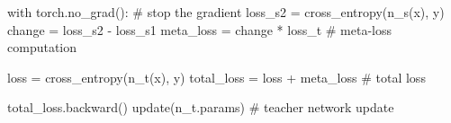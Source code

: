 \begin{algorithm}[!htbp]
\begin{algorithmic}
\State \text{}
\State \hspace{1.1em}	\textcolor{purpleish}{with} torch.no\_grad(): \textcolor{pythoncomment}{\# stop the gradient}
\State \hspace{2.5em} loss\_s2 = cross\_entropy(n\_s(x), y)
\State \hspace{1.1em} change = loss\_s2 - loss\_s1
\State \hspace{1.1em} meta\_loss = change * loss\_t \textcolor{pythoncomment}{\# meta-loss computation}

\State \text{} 
\State \hspace{1.1em} loss = cross\_entropy(n\_t(x), y)
\State \hspace{1.1em} total\_loss = loss + meta\_loss \textcolor{pythoncomment}{\# total loss}

\State \hspace{1.1em} total\_loss.backward()
\State \hspace{1.1em} update(n\_t.params) \textcolor{pythoncomment}{\# teacher network update}

\end{algorithmic}
\end{algorithm}
